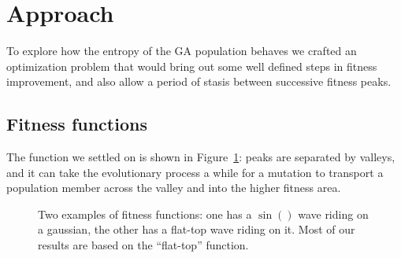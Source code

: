 \documentclass[11pt]{article}
\begin{document}
\section{Approach}
\label{sec:org8c588e5}

To explore how the entropy of the GA population behaves we crafted an
optimization problem that would bring out some well defined steps in
fitness improvement, and also allow a period of stasis between
successive fitness peaks.

\subsection{Fitness functions}

The function we settled on is shown in
Figure~\ref{fig:fit-func_pid3095791}: peaks are separated by valleys,
and it can take the evolutionary process a while for a mutation to
transport a population member across the valley and into the higher
fitness area.

\begin{figure}
  \centering
  \caption{Two examples of fitness functions: one has a $\sin()$ wave
    riding on a gaussian, the other has a flat-top wave riding on it.
  Most of our results are based on the ``flat-top'' function.}
  \label{fig:fit-func_pid3095791}
\end{figure}
\end{document}
